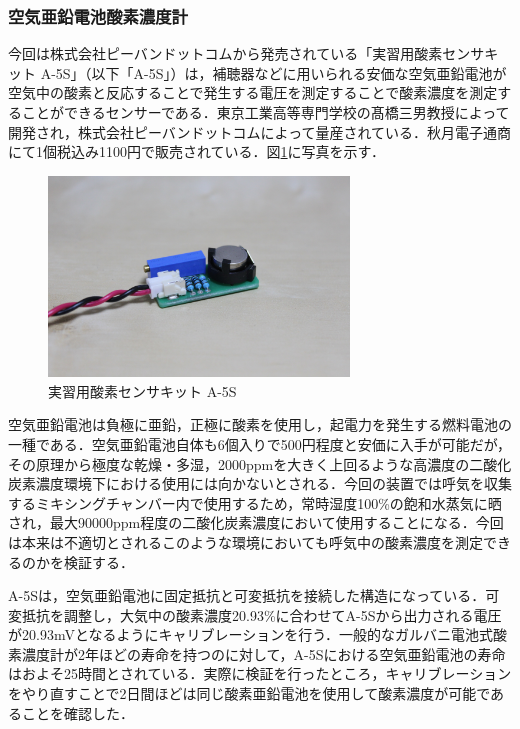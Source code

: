 \subsubsection{空気亜鉛電池酸素濃度計}

今回は株式会社ピーバンドットコムから発売されている「実習用酸素センサキット A-5S」（以下「A-5S」）は，補聴器などに用いられる安価な空気亜鉛電池が空気中の酸素と反応することで発生する電圧を測定することで酸素濃度を測定することができるセンサーである．東京工業高等専門学校の髙橋三男教授によって開発され，株式会社ピーバンドットコムによって量産されている．秋月電子通商にて1個税込み1100円で販売されている．図\ref{fig:a-5s}に写真を示す．

\begin{figure}[H]
  \begin{center}
    \includegraphics[width=8cm]{fig/a-5s}
    \caption{実習用酸素センサキット A-5S}
    \label{fig:a-5s}
  \end{center}
\end{figure}

空気亜鉛電池は負極に亜鉛，正極に酸素を使用し，起電力を発生する燃料電池の一種である．空気亜鉛電池自体も6個入りで500円程度と安価に入手が可能だが，その原理から極度な乾燥・多湿，2000ppmを大きく上回るような高濃度の二酸化炭素濃度環境下における使用には向かないとされる．今回の装置では呼気を収集するミキシングチャンバー内で使用するため，常時湿度100\%の飽和水蒸気に晒され，最大90000ppm程度の二酸化炭素濃度において使用することになる．今回は本来は不適切とされるこのような環境においても呼気中の酸素濃度を測定できるのかを検証する．

A-5Sは，空気亜鉛電池に固定抵抗と可変抵抗を接続した構造になっている．可変抵抗を調整し，大気中の酸素濃度20.93\%に合わせてA-5Sから出力される電圧が20.93mVとなるようにキャリブレーションを行う．一般的なガルバニ電池式酸素濃度計が2年ほどの寿命を持つのに対して，A-5Sにおける空気亜鉛電池の寿命はおよそ25時間とされている．実際に検証を行ったところ，キャリブレーションをやり直すことで2日間ほどは同じ酸素亜鉛電池を使用して酸素濃度が可能であることを確認した．

